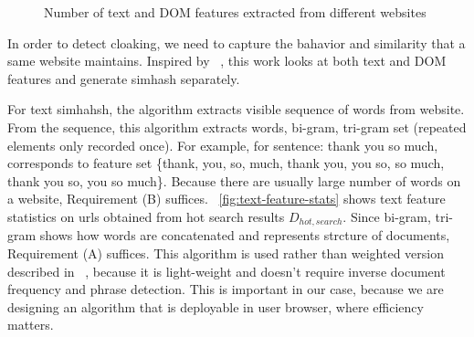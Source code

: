 \begin{figure}[t]
  \centering
  \caption{Number of text and DOM features extracted from different websites}
\end{figure}

In order to detect cloaking, we need to capture the bahavior and similarity that
a same website maintains. Inspired by ~\cite{wang2011cloak}, this work looks at
both text and DOM features and generate simhash separately.

For text simhahsh, the algorithm extracts visible sequence of words from website.
From the sequence, this algorithm extracts words, bi-gram, tri-gram set
(repeated elements only recorded once). For example, for
sentence: thank you so much, corresponds to feature set \{thank, you, so, much,
thank you, you so, so much, thank you so, you so much\}.
Because there are usually large number of words on a website, Requirement (B)
suffices. ~\autoref{fig:text-feature-stats} shows text feature statistics on %
urls obtained from hot search results $D_{hot, search}$. Since bi-gram, tri-gram 
shows how words are concatenated and represents strcture of documents,
Requirement (A) suffices. This algorithm is used rather than weighted version
described in  ~\cite{manku2007detecting}, because it is light-weight and doesn't
require inverse document frequency and phrase detection. This is important
in our case, because we are designing an algorithm that is deployable in user
browser, where efficiency matters.

